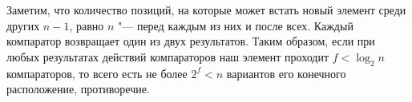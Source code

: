 \section{}
	Заметим, что количество позиций, на которые может встать новый элемент среди других $n-1$, равно $n$ "--- перед каждым из них и после всех. Каждый компаратор возвращает один из двух результатов. Таким образом, если при любых результатах действий компараторов наш элемент проходит $f < \log_2 n$ компараторов, то всего есть не более $2^f < n$ вариантов его конечного расположение, противоречие. 